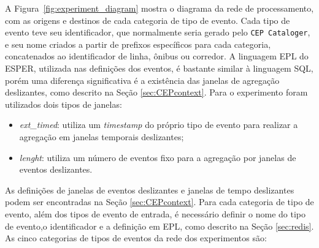 A Figura~\ref{fig:experiment_diagram} mostra o diagrama da rede de processamento, com as origens e destinos de cada categoria de tipo de evento. %
Cada tipo de evento teve seu identificador, que normalmente seria gerado pelo \texttt{CEP Cataloger}, e seu nome criados a partir de prefixos específicos para cada categoria, concatenados ao identificador de linha, ônibus ou corredor. A linguagem EPL do ESPER, utilizada nas definições dos eventos, é bastante similar à linguagem SQL, porém uma diferença significativa é a existência das janelas de agregação deslizantes, como descrito na Seção \ref{sec:CEPcontext}. Para o experimento foram utilizados dois tipos de janelas:


\begin{itemize}
    \item \textit{ext\_timed}: utiliza um \textit{timestamp} do próprio tipo de evento para realizar a agregação em janelas temporais deslizantes;
    \item \textit{lenght}: utiliza um número de eventos fixo para a agregação por janelas de eventos deslizantes.
\end{itemize}
As definições de janelas de eventos deslizantes e janelas de tempo deslizantes podem ser encontradas na Seção \ref{sec:CEPcontext}. Para cada categoria de tipo de evento, além dos tipos de evento de entrada, é necessário definir o nome do tipo de evento,o identificador e a definição em EPL, como descrito na Seção \ref{sec:redis}. As cinco categorias de tipos de eventos da rede dos experimentos são: 

